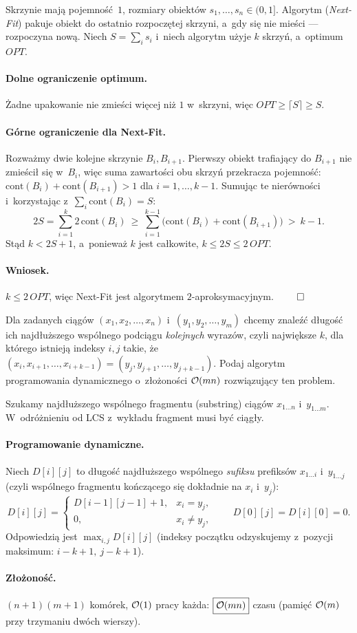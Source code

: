 Skrzynie mają pojemność~$1$, rozmiary obiektów $s_1,\dots,s_n\in(0,1]$. Algorytm
(\emph{Next-Fit}) pakuje obiekt do ostatnio rozpoczętej skrzyni, a~gdy się nie
mieści --- rozpoczyna nową. Niech $S=\sum_i s_i$ i~niech algorytm użyje $k$
skrzyń, a~optimum $OPT$.

\paragraph{Dolne ograniczenie optimum.}
Żadne upakowanie nie zmieści więcej niż $1$ w~skrzyni, więc
$OPT\geq\lceil S\rceil\geq S$.

\paragraph{Górne ograniczenie dla Next-Fit.}
Rozważmy dwie kolejne skrzynie $B_i,B_{i+1}$. Pierwszy obiekt trafiający do
$B_{i+1}$ nie zmieścił się w~$B_i$, więc suma zawartości obu skrzyń przekracza
pojemność: $\mathrm{cont}(B_i)+\mathrm{cont}(B_{i+1})>1$ dla $i=1,\dots,k-1$.
Sumując te nierówności i~korzystając z~$\sum_i\mathrm{cont}(B_i)=S$:
\[
	2S=\sum_{i=1}^{k}2\,\mathrm{cont}(B_i)
	\ \geq\ \sum_{i=1}^{k-1}\big(\mathrm{cont}(B_i)+\mathrm{cont}(B_{i+1})\big)
	\ >\ k-1.
\]
Stąd $k<2S+1$, a~ponieważ $k$ jest całkowite, $k\leq 2S\leq 2\,OPT$.

\paragraph{Wniosek.}
$k\leq 2\,OPT$, więc Next-Fit jest algorytmem $2$-aproksymacyjnym. $\qed$

\clearpage
\begin{zadanie}
	Dla zadanych ciągów $(x_1,x_2,\dots,x_n)$ i~$(y_1,y_2,\dots,y_m)$ chcemy
	znaleźć długość ich najdłuższego wspólnego podciągu \emph{kolejnych} wyrazów,
	czyli największe $k$, dla którego istnieją indeksy $i,j$ takie, że
	$(x_i,x_{i+1},\dots,x_{i+k-1})=(y_j,y_{j+1},\dots,y_{j+k-1})$. Podaj algorytm
	programowania dynamicznego o~złożoności $\mathcal{O}(mn)$ rozwiązujący ten problem.
\end{zadanie}

Szukamy najdłuższego wspólnego  fragmentu (substring) ciągów
$x_{1\ldots n}$ i~$y_{1\ldots m}$. W~odróżnieniu od LCS z~wykładu fragment musi
być ciągły.

\paragraph{Programowanie dynamiczne.}
Niech $D[i][j]$ to długość najdłuższego wspólnego \emph{sufiksu} prefiksów
$x_{1\ldots i}$ i~$y_{1\ldots j}$ (czyli wspólnego fragmentu kończącego się
dokładnie na $x_i$ i~$y_j$):
\[
	D[i][j]=
	\begin{cases}
		D[i-1][j-1]+1, & x_i=y_j,\\
		0,             & x_i\neq y_j,
	\end{cases}
	\qquad D[0][j]=D[i][0]=0.
\]
Odpowiedzią jest $\max_{i,j} D[i][j]$ (indeksy początku odzyskujemy z~pozycji
maksimum: $i-k+1,\ j-k+1$).

\paragraph{Złożoność.}
$(n+1)(m+1)$ komórek, $\mathcal{O}(1)$ pracy każda: $\boxed{\mathcal{O}(mn)}$ czasu
(pamięć $\mathcal{O}(m)$ przy trzymaniu dwóch wierszy).
